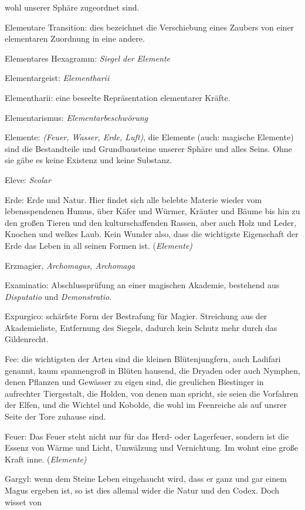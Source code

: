 \documentclass[a5paper,8pt]{book}
\begin{document}
\begin{small}
\begin{description}
wohl unserer Sphäre zugeordnet sind.
 \item Elementare Transition: dies bezeichnet die Ver­schiebung eines Zaubers von einer elementaren Zu­ordnung in eine andere.
 \item Elementares Hexagramm: \textit{Siegel der Elemente}
 \item Elementargeist: \textit{Elementharii}
 \item Elementharii: eine beseelte Repräsentation elemen­tarer Kräfte.
 \item Elementarismus: \textit{Elementarbeschwörung} 
 \item Elemente: \textit{(Feuer, Wasser, Erde, Luft)}, die Elemente (auch: magische Elemente) sind die Bestandteile und Grundbausteine unserer Sphäre und alles Seins.
Ohne sie gäbe es keine Existenz und keine Substanz. 
 \item Eleve: \textit{Scolar}
 \item Erde: Erde und Natur. Hier findet sich alle belebte Materie wieder vom lebensspendenen Humus, über Käfer und Würmer, Kräuter und Bäume bis hin zu den großen Tieren 
und den kulturschaffenden Rassen, aber auch Holz und Leder, Knochen und welkes Laub. Kein Wunder also, dass die wichtigste Eigenschaft der Erde das Leben in all 
seinen Formen ist. (\textit{Elemente)}
 \item Erzmagier, \textit{Archomagus, Archomaga}
 \item Examinatio: Abschlussprüfung an einer magischen Akademie, bestehend aus \textit{Disputatio} und \textit{Demon­stratio}.
 \item Expurgico: schärfste Form der Bestrafung für Magier. Streichung aus der Akademieliste, Entfernung des Siegels, dadurch kein Schutz mehr durch das Gildenrecht.
 \item Fee: die wichtigsten der Arten sind die kleinen Blütenjungfern, auch Ladifari genannt, kaum spannen­groß in Blüten hausend, die Dryaden oder auch Nymphen, denen 
Pflanzen und Gewässer zu eigen sind, die greulichen Biestinger in aufrechter Tiergestalt, die Holden, von denen man spricht, sie seien die Vorfahren der Elfen, 
und die Wichtel und Kobolde, die wohl im Feenreiche als auf unsrer Seite der Tore zuhause sind.
 \item Feuer: Das Feuer steht nicht nur für das Herd- oder Lagerfeuer, sondern ist die Essenz von Wärme und Licht, Umwälzung und Vernichtung. Im wohnt eine große Kraft 
inne. (\textit{Elemente)}
 \item Gargyl: wenn dem Steine Leben eingehaucht wird, dass er ganz und gar einem Magus ergeben ist, so ist dies allemal wider die Natur und den Codex. Doch wisset von 

\end{description}
\end{small}
\end{document}

